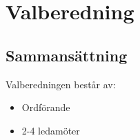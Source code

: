 \section{Valberedning}
 
\subsection{Sammansättning}
Valberedningen består av:
\begin{itemize}
	\item Ordförande
	\item 2-4 ledamöter
\end{itemize}
